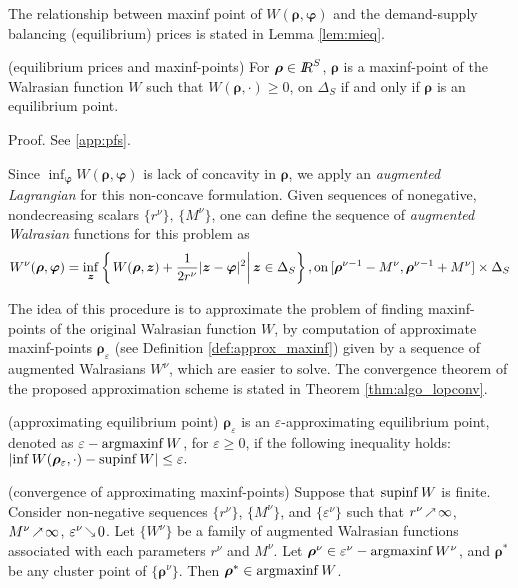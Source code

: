 \documentclass[review]{elsarticle}
\begin{document}
The relationship between maxinf point of $W(\bm{\rho},\bm{\varphi})$ and the demand-supply balancing (equilibrium) prices is stated in Lemma \ref{lem:mieq}.

\begin{lemma}{(equilibrium prices and maxinf-points)}\label{lem:mieq}
For $\bm{\rho} \in{I\kern-.35em R}^S$, $\bm{\rho}$ is a maxinf-point of the Walrasian function $W$ such that $W(\bm{\rho}, \cdot) \geq 0$,
on $\Delta_S$ if and only if $\bm{\rho}$ is an equilibrium point. 
\end{lemma}

\state Proof. See \ref{app:pfs}. \eop

Since $\inf_{\bm{\varphi}} W(\bm{\rho},\bm{\varphi})$ is lack of concavity in $\bm{\rho}$, we apply an \emph{augmented Lagrangian}
for this non-concave formulation. Given sequences of nonegative, nondecreasing scalars $\{r^\nu\},\,\{M^\nu\}$, one can define the sequence of \emph{augmented Walrasian}
functions for this problem as
\begin{equation}
    W^\nu(\bm{\rho},\bm{\varphi})=\inf_{\bm{z}}\left\{\left.W(\bm{\rho},\bm{z})+\frac{1}{2r^\nu}|\bm{z}-\bm{\varphi}|^2\right|\bm{z}\in\Delta_S\right\},{\rm on }\, [\bm{\rho}^{\nu -1}-M^\nu,\bm{\rho}^{\nu-1}+M^\nu]\times\Delta_S
\end{equation}

The idea of this procedure is to approximate the problem of finding maxinf-points of the original Walrasian function $W$, by computation of approximate maxinf-points $\bm{\rho}_\varepsilon$ (see Definition \ref{def:approx_maxinf}) given by a sequence
of augmented Walrasians $W^\nu$, which are easier to solve. The convergence theorem of the proposed approximation scheme is stated in Theorem \ref{thm:algo_lopconv}.

\begin{defn}{(approximating equilibrium point)}
$\bm{\rho}_\varepsilon$ is an 
$\varepsilon$-approximating equilibrium point, denoted as $\varepsilon-\mathop{\rm argmaxinf}\nolimits W$, for $\varepsilon\geq 0$, if the following inequality holds:
$\left|\mathop{\rm inf}\nolimits W(\bm{\rho}_\varepsilon,\cdot)- \mathop{\rm supinf}\nolimits W\right|\leq \varepsilon.$
\label{def:approx_maxinf}
\end{defn}

\begin{theorem}{(convergence of approximating maxinf-points)}\label{thm:algo_lopconv}
Suppose that $\mathop{\rm supinf}\nolimits W$ is finite. Consider non-negative sequences $\{r^\nu\}$, $\{M^\nu\}$, and $\{\varepsilon^\nu\}$
such that $r^\nu \upto \infty$, $M^\nu\upto \infty$, $\varepsilon^\nu\downto 0$. Let $\{W^\nu\}$
be a family of augmented Walrasian functions associated with each parameters $r^\nu$ and $M^\nu$.
Let $\bm{\rho}^\nu\in\varepsilon^\nu-\mathop{\rm argmaxinf}\nolimits W^\nu$,
and $\bm{\rho}^*$ be any cluster point of $\{\bm{\rho}^\nu\}$. Then $\bm{\rho}^*\in\mathop{\rm argmaxinf}\nolimits W$.
\end{theorem}
\end{document}
